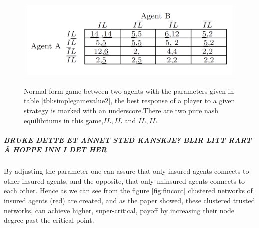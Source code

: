\begin{figure}[h]
\centering
\begin{tabular}{@{}c@{}}
\includegraphics[width=1.0\textwidth]{../Figures/NotOptimalGameWithNumbers.png}
\end{tabular}
\caption[Caption for LOF]{Normal form game between two agents with the parameters given in table \ref{tbl:simplegamevalue2}, the best response of a player to a given strategy is marked with an underscore.There are two pure nash equilibriums in this game,$IL,IL$ and $I\underline{L},I\underline{L}$. \label{fig:NFnumbersViolating}}
\end{figure}



\subparagraph{BRUKE DETTE ET ANNET STED KANSKJE? BLIR LITT RART Å HOPPE INN I DET HER}
By adjusting the parameter one can assure that only insured agents connects to other insured agents, and the opposite,
that only uninsured agents connects to each other. Hence as we can see from the figure \ref{fig:fincont} clustered
networks of insured agents (red) are created, and  as the paper \cite{contagion} showed, these clustered trusted
networks, can achieve higher, super-critical, payoff by increasing their node degree past the critical point.

